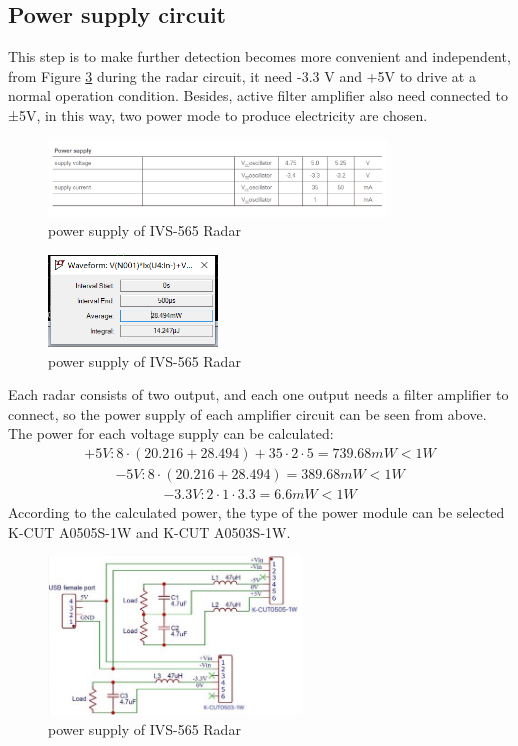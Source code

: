 \subsection{Power supply circuit}
This step is to make further detection becomes more convenient and independent, from Figure \ref{fig:power_radar} during the radar circuit, it need -3.3 V and +5V to drive at a normal operation condition. Besides, active filter amplifier also need connected to ±5V, in this way, two power mode to produce electricity are chosen.
\begin{figure}[H]
    \centering
    \includegraphics[width=0.8\textwidth]{figure/powersupplyofIVS565Radar.png}
    \caption{power supply of IVS-565 Radar}
    \label{fig:power_radar}
\end{figure}
\begin{figure}[H]
    \centering
    \includegraphics[width=0.4\textwidth]{figure/powerAM2.png}
    \caption{power supply of IVS-565 Radar}
    \label{fig:power_radar}
\end{figure}
Each radar consists of two output, and each one output needs a filter amplifier to connect, so the power supply of each amplifier circuit can be seen from above.
The power for each voltage supply can be calculated:
\begin{align}
+5 V: 8\cdot(20.216+28.494)+35\cdot2\cdot5=739.68 m W<1 W
\end{align}
\begin{align}
-5 V: 8\cdot(20.216+28.494)=389.68 m W<1 W
\end{align}
\begin{align}
-3.3 V: 2\cdot1\cdot3.3=6.6 m W<1 W
\end{align}
According to the calculated power, the type of the power module can be selected K-CUT A0505S-1W and K-CUT A0503S-1W.

\begin{figure}[H]
    \centering
    \includegraphics[width=0.6\textwidth]{figure/powersupplycircuit.jpg}
    \caption{power supply of IVS-565 Radar}
    \label{fig:power_radar}
\end{figure}

